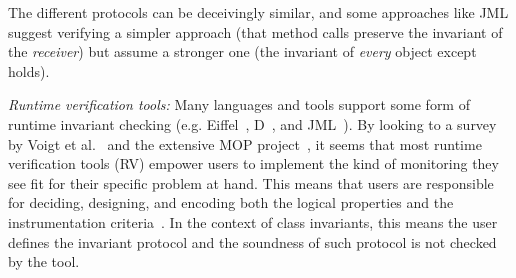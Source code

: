The different protocols can be deceivingly similar, and 
some approaches like JML suggest verifying a simpler approach (that method calls preserve the invariant of the \emph{receiver}) but assume a stronger one (the invariant of \emph{every} object except \Q@this@ holds).






\newcommand\sepItems{\saveSpace\saveSpace\saveSpace\\*${}_{}$\\*${}_{}\,\bullet\,$}

\textit{Runtime verification tools:}
Many languages and tools support some form of runtime invariant checking (e.g. Eiffel~\cite{Meyer:1992:EL:129093}, D~\cite{Alexandrescu:2010:DPL:1875434},
and JML~\cite{Burdy2005}).
By looking to a survey by Voigt et al.~\cite{Voigt2013} and the extensive MOP project~\cite{meredith2012overview},
it seems that most runtime verification tools (RV) empower users
to implement the kind of monitoring they see fit for their specific problem at hand. This means that users are responsible for deciding, designing, and encoding both the logical properties and the instrumentation criteria~\cite{meredith2012overview}.
In the context of class invariants, this means the user defines the invariant protocol and the soundness of such protocol is not checked by the tool.

